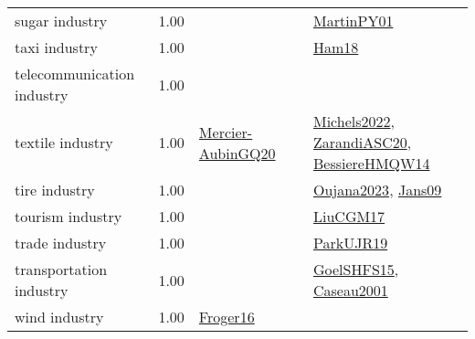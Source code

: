 {\begin{longtable}{p{3cm}r>{\raggedright\arraybackslash}p{6cm}>{\raggedright\arraybackslash}p{6cm}>{\raggedright\arraybackslash}p{8cm}}
\index{sugar industry}\index{Industries!sugar industry}sugar industry &  1.00 &  &  & \hyperref[detail:MartinPY01]{MartinPY01}\\
\index{taxi industry}\index{Industries!taxi industry}taxi industry &  1.00 &  &  & \hyperref[detail:Ham18]{Ham18}\\
\index{telecommunication industry}\index{Industries!telecommunication industry}telecommunication industry &  1.00 &  &  & \\
\index{textile industry}\index{Industries!textile industry}textile industry &  1.00 & \hyperref[detail:Mercier-AubinGQ20]{Mercier-AubinGQ20} &  & \hyperref[detail:Michels2022]{Michels2022}, \hyperref[detail:ZarandiASC20]{ZarandiASC20}, \hyperref[detail:BessiereHMQW14]{BessiereHMQW14}\\
\index{tire industry}\index{Industries!tire industry}tire industry &  1.00 &  &  & \hyperref[detail:Oujana2023]{Oujana2023}, \hyperref[detail:Jans09]{Jans09}\\
\index{tourism industry}\index{Industries!tourism industry}tourism industry &  1.00 &  &  & \hyperref[detail:LiuCGM17]{LiuCGM17}\\
\index{trade industry}\index{Industries!trade industry}trade industry &  1.00 &  &  & \hyperref[detail:ParkUJR19]{ParkUJR19}\\
\index{transportation industry}\index{Industries!transportation industry}transportation industry &  1.00 &  &  & \hyperref[detail:GoelSHFS15]{GoelSHFS15}, \hyperref[detail:Caseau2001]{Caseau2001}\\
\index{wind industry}\index{Industries!wind industry}wind industry &  1.00 & \hyperref[detail:Froger16]{Froger16} &  & \\
\end{longtable}
}

\clearpage
